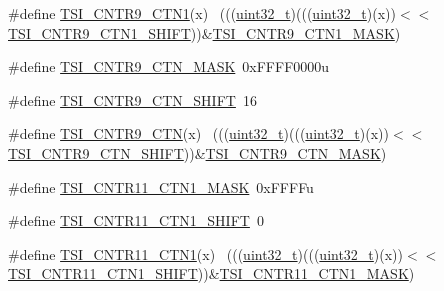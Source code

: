 \begin{DoxyCompactItemize}
\item 
\#define \hyperlink{group___t_s_i___register___masks_ga4f5647846911939a0e7a8eb185a01913}{T\+S\+I\+\_\+\+C\+N\+T\+R9\+\_\+\+C\+T\+N1}(x)                                            ~(((\hyperlink{_p_e___types_8h_a33594304e786b158f3fb30289278f5af}{uint32\+\_\+t})(((\hyperlink{_p_e___types_8h_a33594304e786b158f3fb30289278f5af}{uint32\+\_\+t})(x))$<$$<$\hyperlink{group___t_s_i___register___masks_ga22e9b412d3df505c3f1283d700c5a192}{T\+S\+I\+\_\+\+C\+N\+T\+R9\+\_\+\+C\+T\+N1\+\_\+\+S\+H\+I\+FT}))\&\hyperlink{group___t_s_i___register___masks_gac90318dbf7dc8a739eae6636a7079613}{T\+S\+I\+\_\+\+C\+N\+T\+R9\+\_\+\+C\+T\+N1\+\_\+\+M\+A\+SK})
\item 
\#define \hyperlink{group___t_s_i___register___masks_ga0df38f853064b362e6ecf50598304b7c}{T\+S\+I\+\_\+\+C\+N\+T\+R9\+\_\+\+C\+T\+N\+\_\+\+M\+A\+SK}~0x\+F\+F\+F\+F0000u
\item 
\#define \hyperlink{group___t_s_i___register___masks_ga209e7bab4fc4a6490bd7e64741d0e5c8}{T\+S\+I\+\_\+\+C\+N\+T\+R9\+\_\+\+C\+T\+N\+\_\+\+S\+H\+I\+FT}~16
\item 
\#define \hyperlink{group___t_s_i___register___masks_ga97a9615523f7d4d083f0327a62603ebd}{T\+S\+I\+\_\+\+C\+N\+T\+R9\+\_\+\+C\+TN}(x)                                              ~(((\hyperlink{_p_e___types_8h_a33594304e786b158f3fb30289278f5af}{uint32\+\_\+t})(((\hyperlink{_p_e___types_8h_a33594304e786b158f3fb30289278f5af}{uint32\+\_\+t})(x))$<$$<$\hyperlink{group___t_s_i___register___masks_ga209e7bab4fc4a6490bd7e64741d0e5c8}{T\+S\+I\+\_\+\+C\+N\+T\+R9\+\_\+\+C\+T\+N\+\_\+\+S\+H\+I\+FT}))\&\hyperlink{group___t_s_i___register___masks_ga0df38f853064b362e6ecf50598304b7c}{T\+S\+I\+\_\+\+C\+N\+T\+R9\+\_\+\+C\+T\+N\+\_\+\+M\+A\+SK})
\item 
\#define \hyperlink{group___t_s_i___register___masks_ga20e6e5cb203746144a70994cf2b686ef}{T\+S\+I\+\_\+\+C\+N\+T\+R11\+\_\+\+C\+T\+N1\+\_\+\+M\+A\+SK}~0x\+F\+F\+F\+Fu
\item 
\#define \hyperlink{group___t_s_i___register___masks_gad389afd656e4be5c3a0d57d32a401db5}{T\+S\+I\+\_\+\+C\+N\+T\+R11\+\_\+\+C\+T\+N1\+\_\+\+S\+H\+I\+FT}~0
\item 
\#define \hyperlink{group___t_s_i___register___masks_ga5603c5277384add87a5972f0b2360395}{T\+S\+I\+\_\+\+C\+N\+T\+R11\+\_\+\+C\+T\+N1}(x)                                          ~(((\hyperlink{_p_e___types_8h_a33594304e786b158f3fb30289278f5af}{uint32\+\_\+t})(((\hyperlink{_p_e___types_8h_a33594304e786b158f3fb30289278f5af}{uint32\+\_\+t})(x))$<$$<$\hyperlink{group___t_s_i___register___masks_gad389afd656e4be5c3a0d57d32a401db5}{T\+S\+I\+\_\+\+C\+N\+T\+R11\+\_\+\+C\+T\+N1\+\_\+\+S\+H\+I\+FT}))\&\hyperlink{group___t_s_i___register___masks_ga20e6e5cb203746144a70994cf2b686ef}{T\+S\+I\+\_\+\+C\+N\+T\+R11\+\_\+\+C\+T\+N1\+\_\+\+M\+A\+SK})
$$
\end{DoxyCompactItemize}
